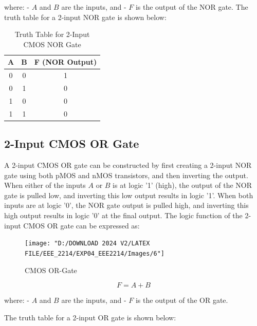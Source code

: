 \documentclass[a4paper,12pt]{article}
\begin{document}
where:
- \( A \) and \( B \) are the inputs, and
- \( F \) is the output of the NOR gate.
	\newpage
	The truth table for a 2-input NOR gate is shown below:
	
	\begin{table}[H]
		\centering
		\caption{Truth Table for 2-Input CMOS NOR Gate}
		\begin{tabular}{|c|c|c|}
			\hline
			\textbf{A} & \textbf{B} & \textbf{F (NOR Output)} \\ \hline
			0          & 0          & 1                       \\ \hline
			0          & 1          & 0                       \\ \hline
			1          & 0          & 0                       \\ \hline
			1          & 1          & 0                       \\ \hline
		\end{tabular}
		
		\label{tab:nand_gate}
	\end{table}
	
	\subsection{2-Input CMOS OR Gate}
A 2-input CMOS OR gate can be constructed by first creating a 2-input NOR gate using both pMOS and nMOS transistors, and then inverting the output. When either of the inputs \( A \) or \( B \) is at logic '1' (high), the output of the NOR gate is pulled low, and inverting this low output results in logic '1'. When both inputs are at logic '0', the NOR gate output is pulled high, and inverting this high output results in logic '0' at the final output. The logic function of the 2-input CMOS OR gate can be expressed as:


	
	\begin{figure}[H]
		\centering
	\texttt{[image: "D:/DOWNLOAD 2024 V2/LATEX FILE/EEE\_2214/EXP04\_EEE2214/Images/6"]}
	\caption{CMOS OR-Gate}
		\label{fig:8}
	\end{figure}
	
	\[
	F = A + B
	\]
	
	where:
	- \( A \) and \( B \) are the inputs, and
	- \( F \) is the output of the OR gate.
	
	The truth table for a 2-input OR gate is shown below:
	
\end{document}
